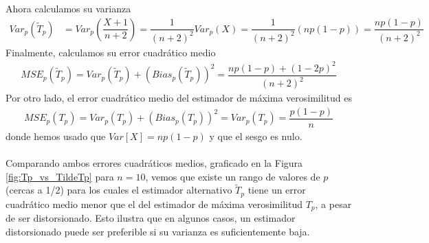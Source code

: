 \begin{ejemplo}
    Ahora calculamos su varianza
    \begin{align*}
        Var_p(\tilde{T}_p) &= Var_p\left( \dfrac{X+1}{n+2} \right) = \dfrac{1}{(n+2)^2} Var_p(X) = \dfrac{1}{(n+2)^2} (np(1-p)) = \dfrac{np(1-p)}{(n+2)^2}
    \end{align*}
    Finalmente, calculamos su error cuadrático medio
    \begin{align*}
        MSE_p(\tilde{T}_p) = Var_p(\tilde{T}_p) + (Bias_p(\tilde{T}_p))^2= \dfrac{np(1-p) + (1 - 2p)^2}{(n+2)^2}
    \end{align*}
    Por otro lado, el error cuadrático medio del estimador de máxima verosimilitud es
    \begin{align*}
        MSE_p(T_p) = Var_p(T_p) + (Bias_p(T_p))^2 = Var_p(T_p) = \dfrac{p(1-p)}{n}
    \end{align*}
    donde hemos usado que $Var[X] = np(1-p)$ y que el sesgo es nulo. \\ \\  
    \noindent
    Comparando ambos errores cuadráticos medios, graficado en la Figura \ref{fig:Tp_vs_TildeTp} para $n=10$, vemos que existe un rango de valores de $p$ (cercas a 1/2) para los cuales el estimador alternativo $\tilde{T}_p$ tiene un error cuadrático medio menor que el del estimador de máxima verosimilitud $T_p$, a pesar de ser distorsionado. Esto ilustra que en algunos casos, un estimador distorsionado puede ser preferible si su varianza es suficientemente baja.
\end{ejemplo}

